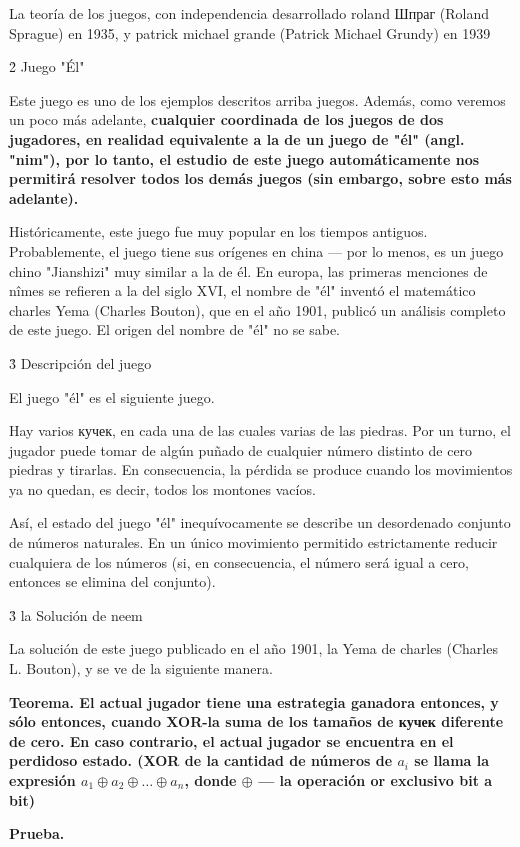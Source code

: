 La teoría de los juegos, con independencia desarrollado roland Шпраг (Roland Sprague) en 1935, y patrick michael grande (Patrick Michael Grundy) en 1939


\h2{ Juego "Él" }

Este juego es uno de los ejemplos descritos arriba juegos. Además, como veremos un poco más adelante, \bf{cualquier} coordinada de los juegos de dos jugadores, en realidad equivalente a la de un juego de "él" (angl. "nim"), por lo tanto, el estudio de este juego automáticamente nos permitirá resolver todos los demás juegos (sin embargo, sobre esto más adelante).

Históricamente, este juego fue muy popular en los tiempos antiguos. Probablemente, el juego tiene sus orígenes en china --- por lo menos, es un juego chino "Jianshizi" muy similar a la de él. En europa, las primeras menciones de nîmes se refieren a la del siglo XVI, el nombre de "él" inventó el matemático charles Yema (Charles Bouton), que en el año 1901, publicó un análisis completo de este juego. El origen del nombre de "él" no se sabe.


\h3{ Descripción del juego }

El juego "él" es el siguiente juego.

Hay varios кучек, en cada una de las cuales varias de las piedras. Por un turno, el jugador puede tomar de algún puñado de cualquier número distinto de cero piedras y tirarlas. En consecuencia, la pérdida se produce cuando los movimientos ya no quedan, es decir, todos los montones vacíos.

Así, el estado del juego "él" inequívocamente se describe un desordenado conjunto de números naturales. En un único movimiento permitido estrictamente reducir cualquiera de los números (si, en consecuencia, el número será igual a cero, entonces se elimina del conjunto).


\h3{ la Solución de neem }

La solución de este juego publicado en el año 1901, la Yema de charles (Charles L. Bouton), y se ve de la siguiente manera.

\bf{Teorema}. El actual jugador tiene una estrategia ganadora entonces, y sólo entonces, cuando XOR-la suma de los tamaños de кучек diferente de cero. En caso contrario, el actual jugador se encuentra en el perdidoso estado. (XOR de la cantidad de números de $a_i$ se llama la expresión $a_1 \oplus a_2 \oplus \ldots \oplus a_n$, donde $\oplus$ --- la operación or exclusivo bit a bit)

\bf{Prueba}.


